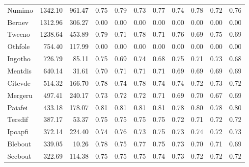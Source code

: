 \begin{table}[htbp!]
\begin{tabular}{lrrrrrrrrrr}
Numimo & 1342.10 & 961.47 & 0.75 & 0.79 & 0.73 & 0.77 & 0.74 & 0.78 & 0.72 & 0.76 \\
Bernev & 1312.96 & 306.27 & 0.00 & 0.00 & 0.00 & 0.00 & 0.00 & 0.00 & 0.00 & 0.00 \\
Tweeno & 1238.64 & 453.89 & 0.79 & 0.71 & 0.78 & 0.71 & 0.76 & 0.69 & 0.75 & 0.69 \\
Othfole & 754.40 & 117.99 & 0.00 & 0.00 & 0.00 & 0.00 & 0.00 & 0.00 & 0.00 & 0.00 \\
Ingotho & 726.79 & 85.11 & 0.75 & 0.69 & 0.74 & 0.68 & 0.75 & 0.71 & 0.73 & 0.68 \\
Mentdis & 640.14 & 31.61 & 0.70 & 0.71 & 0.71 & 0.71 & 0.69 & 0.69 & 0.69 & 0.69 \\
Citevde & 514.32 & 166.70 & 0.78 & 0.74 & 0.78 & 0.74 & 0.74 & 0.72 & 0.73 & 0.72 \\
Mergeru & 497.41 & 240.17 & 0.73 & 0.72 & 0.72 & 0.71 & 0.69 & 0.70 & 0.67 & 0.69 \\
Paiafei & 433.18 & 178.07 & 0.81 & 0.81 & 0.81 & 0.81 & 0.78 & 0.80 & 0.78 & 0.80 \\
Tersdif & 387.17 & 53.37 & 0.75 & 0.75 & 0.75 & 0.75 & 0.72 & 0.71 & 0.72 & 0.72 \\
Ipoapfi & 372.14 & 224.40 & 0.74 & 0.76 & 0.73 & 0.75 & 0.73 & 0.74 & 0.72 & 0.73 \\
Blebout & 339.05 & 10.26 & 0.78 & 0.75 & 0.77 & 0.75 & 0.73 & 0.70 & 0.71 & 0.69 \\
Secbout & 322.69 & 114.38 & 0.75 & 0.75 & 0.75 & 0.74 & 0.73 & 0.72 & 0.72 & 0.72 \\
\bottomrule
\end{tabular}
\end{table}
